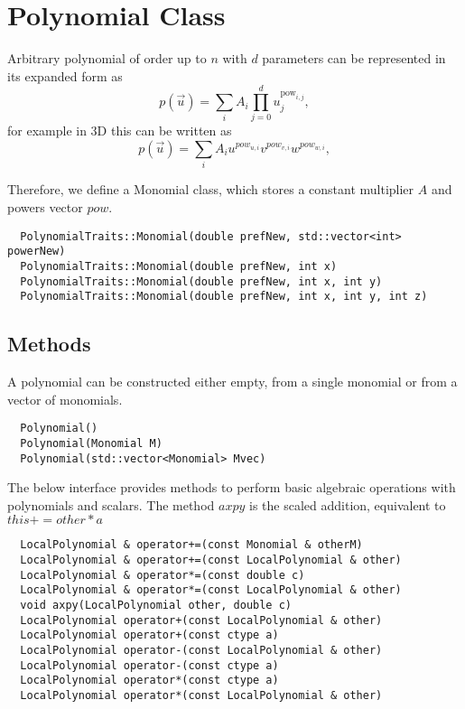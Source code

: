 \section{Polynomial Class}
\label{interface-geometry-polynomial}


\noindent
Arbitrary polynomial of order up to $n$ with $d$ parameters can be represented in its expanded form as
\[ p(\vec{u}) = \sum_i A_i \prod_{j = 0}^d u_j^{\mathrm{pow}_{i,j}},  \]
for example in 3D this can be written as
\[ p(\vec{u}) = \sum_i A_i u^{pow_{u,i}} v^{pow_{v,i}} w^{pow_{w, i}},  \]

\noindent
Therefore, we define a Monomial class, which stores a constant multiplier $A$ and powers vector $pow$. \\

\begin{mybox}
\begin{lstlisting}
  PolynomialTraits::Monomial(double prefNew, std::vector<int> powerNew)
  PolynomialTraits::Monomial(double prefNew, int x)
  PolynomialTraits::Monomial(double prefNew, int x, int y)
  PolynomialTraits::Monomial(double prefNew, int x, int y, int z)
\end{lstlisting}
\end{mybox}




\subsection{Methods}
\label{interface-geometry-polynomial-methods}


A polynomial can be constructed either empty, from a single monomial or from a vector of monomials. \\

\begin{mybox}
\begin{lstlisting}
  Polynomial()
  Polynomial(Monomial M)
  Polynomial(std::vector<Monomial> Mvec)
\end{lstlisting}
\end{mybox}

\noindent
The below interface provides methods to perform basic algebraic operations with polynomials and scalars. The method $axpy$ is the scaled addition, equivalent to $this += other * a$ \\

\begin{mybox}
\begin{lstlisting}
  LocalPolynomial & operator+=(const Monomial & otherM)
  LocalPolynomial & operator+=(const LocalPolynomial & other)
  LocalPolynomial & operator*=(const double c)  
  LocalPolynomial & operator*=(const LocalPolynomial & other)  
  void axpy(LocalPolynomial other, double c)
  LocalPolynomial operator+(const LocalPolynomial & other)
  LocalPolynomial operator+(const ctype a)  
  LocalPolynomial operator-(const LocalPolynomial & other)  
  LocalPolynomial operator-(const ctype a)  
  LocalPolynomial operator*(const ctype a)  
  LocalPolynomial operator*(const LocalPolynomial & other)
\end{lstlisting}
\end{mybox}

